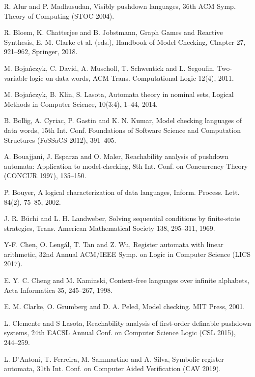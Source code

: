 \begin{thebibliography}{99}
 R. Alur and P. Madhusudan, Visibly pushdown languages,
36th ACM Symp. Theory of Computing (STOC 2004).

 R. Bloem, K. Chatterjee and B. Jobstmann, Graph Games and Reactive Synthesis,
E. M. Clarke et al. (eds.), Handbook of Model Checking, Chapter 27, 921--962, Springer, 2018.

M. Boja\'{n}czyk, C. David, A. Muscholl, T. Schwentick and L. Segoufin,
Two-variable logic on data words,
ACM Trans. Computational Logic 12(4), 2011.

M. Boja\'{n}czyk, B. Klin, S. Lasota,
Automata theory in nominal sets,
Logical Methods in Computer Science, 10(3:4), 1--44, 2014.

B. Bollig, A. Cyriac, P. Gastin and K. N. Kumar,
Model checking languages of data words,
15th Int. Conf. Foundations of Software Science and Computation Structures
(FoSSaCS 2012), 391--405. %

A. Bouajjani, J. Esparza and O. Maler,
Reachability analysis of pushdown automata: Application to model-checking,
8th Int. Conf. on Concurrency Theory (CONCUR 1997),
135--150.

P. Bouyer,
A logical characterization of data languages,
Inform. Process. Lett. 84(2), 75--85, 2002.

 J. R. B\"{u}chi and L. H. Landweber, Solving sequential conditions by finite-state strategies,
Trans. American Mathematical Society 138, 295--311, 1969.

Y-F. Chen, O. Leng\'{a}l, T. Tan and Z. Wu,
Register automata with linear arithmetic,
32nd Annual ACM/IEEE Symp. on Logic in Computer Science (LICS 2017).

E. Y. C. Cheng and M. Kaminski,
Context-free languages over infinite alphabets,
Acta Informatica 35, 245--267, 1998.

E. M. Clarke, O. Grumberg and D. A. Peled, Model checking. MIT Press, 2001.

L. Clemente and S Lasota,
Reachability analysis of first-order definable pushdown systems,
24th EACSL Annual Conf. on Computer Science Logic (CSL 2015), 244--259. %

L. D'Antoni, T. Ferreira, M. Sammartino and A. Silva,
Symbolic register automata,
31th Int. Conf. on Computer Aided Verification (CAV 2019).


\end{thebibliography}
